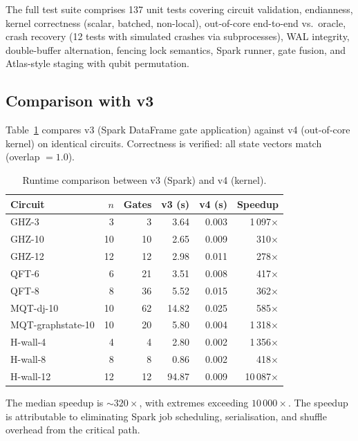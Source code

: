 The full test suite comprises 137 unit tests covering circuit
validation, endianness, kernel correctness (scalar, batched, non-local),
out-of-core end-to-end vs.\ oracle, crash recovery (12 tests with
simulated crashes via subprocesses), WAL integrity, double-buffer
alternation, fencing lock semantics, Spark runner, gate fusion, and
Atlas-style staging with qubit permutation.

\subsection{Comparison with v3}
\label{sec:v3-comparison}

Table~\ref{tab:v3-comparison} compares v3 (Spark DataFrame gate
application) against v4 (out-of-core kernel) on identical circuits.
Correctness is verified: all state vectors match (overlap $= 1.0$).

\begin{table}[h]
\centering
\caption{Runtime comparison between v3 (Spark) and v4 (kernel).}
\label{tab:v3-comparison}
\begin{tabular}{lrrrrr}
\toprule
Circuit & $n$ & Gates & v3 (s) & v4 (s) & Speedup \\
\midrule
GHZ-3            &  3 &     3 &   3.64 & 0.003 & 1\,097$\times$ \\
GHZ-10           & 10 &    10 &   2.65 & 0.009 &    310$\times$ \\
GHZ-12           & 12 &    12 &   2.98 & 0.011 &    278$\times$ \\
QFT-6            &  6 &    21 &   3.51 & 0.008 &    417$\times$ \\
QFT-8            &  8 &    36 &   5.52 & 0.015 &    362$\times$ \\
MQT-dj-10        & 10 &    62 &  14.82 & 0.025 &    585$\times$ \\
MQT-graphstate-10& 10 &    20 &   5.80 & 0.004 & 1\,318$\times$ \\
H-wall-4         &  4 &     4 &   2.80 & 0.002 & 1\,356$\times$ \\
H-wall-8         &  8 &     8 &   0.86 & 0.002 &    418$\times$ \\
H-wall-12        & 12 &    12 &  94.87 & 0.009 &10\,087$\times$ \\
\bottomrule
\end{tabular}
\end{table}

The median speedup is ${\sim}320\times$, with extremes exceeding
$10\,000\times$. The speedup is attributable to eliminating Spark job
scheduling, serialisation, and shuffle overhead from the critical path.

